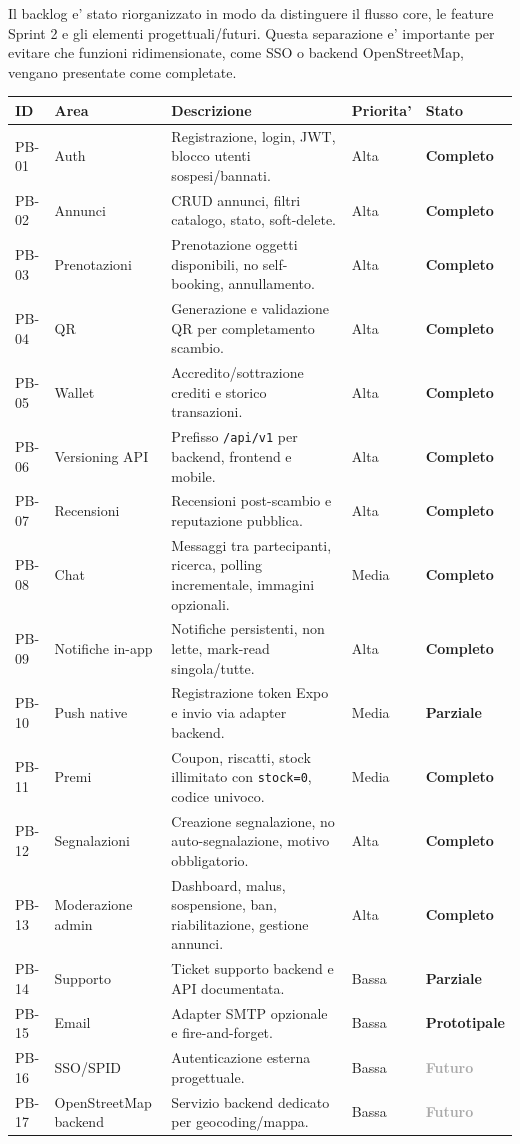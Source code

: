 \documentclass[11pt,a4paper]{article}
\newcommand{\ok}{\textcolor{revalueGreen}{\textbf{Completo}}}
\newcommand{\partiale}{\textcolor{revalueOrange}{\textbf{Parziale}}}
\newcommand{\proto}{\textcolor{revalueOrange}{\textbf{Prototipale}}}
\newcommand{\future}{\textcolor{darkGray}{\textbf{Futuro}}}
\newcommand{\code}[1]{\texttt{#1}}
\begin{document}
Il backlog e' stato riorganizzato in modo da distinguere il flusso core, le feature
Sprint 2 e gli elementi progettuali/futuri. Questa separazione e' importante per
evitare che funzioni ridimensionate, come SSO o backend OpenStreetMap, vengano
presentate come completate.

\begin{longtable}{L{1.2cm} L{3.2cm} L{5.6cm} L{2.1cm} L{2.4cm}}
\toprule
\textbf{ID} & \textbf{Area} & \textbf{Descrizione} & \textbf{Priorita'} & \textbf{Stato} \\
\midrule
PB-01 & Auth & Registrazione, login, JWT, blocco utenti sospesi/bannati. & Alta & \ok \\
PB-02 & Annunci & CRUD annunci, filtri catalogo, stato, soft-delete. & Alta & \ok \\
PB-03 & Prenotazioni & Prenotazione oggetti disponibili, no self-booking, annullamento. & Alta & \ok \\
PB-04 & QR & Generazione e validazione QR per completamento scambio. & Alta & \ok \\
PB-05 & Wallet & Accredito/sottrazione crediti e storico transazioni. & Alta & \ok \\
PB-06 & Versioning API & Prefisso \code{/api/v1} per backend, frontend e mobile. & Alta & \ok \\
PB-07 & Recensioni & Recensioni post-scambio e reputazione pubblica. & Alta & \ok \\
PB-08 & Chat & Messaggi tra partecipanti, ricerca, polling incrementale, immagini opzionali. & Media & \ok \\
PB-09 & Notifiche in-app & Notifiche persistenti, non lette, mark-read singola/tutte. & Alta & \ok \\
PB-10 & Push native & Registrazione token Expo e invio via adapter backend. & Media & \partiale \\
PB-11 & Premi & Coupon, riscatti, stock illimitato con \code{stock=0}, codice univoco. & Media & \ok \\
PB-12 & Segnalazioni & Creazione segnalazione, no auto-segnalazione, motivo obbligatorio. & Alta & \ok \\
PB-13 & Moderazione admin & Dashboard, malus, sospensione, ban, riabilitazione, gestione annunci. & Alta & \ok \\
PB-14 & Supporto & Ticket supporto backend e API documentata. & Bassa & \partiale \\
PB-15 & Email & Adapter SMTP opzionale e fire-and-forget. & Bassa & \proto \\
PB-16 & SSO/SPID & Autenticazione esterna progettuale. & Bassa & \future \\
PB-17 & OpenStreetMap backend & Servizio backend dedicato per geocoding/mappa. & Bassa & \future \\
\bottomrule
\end{longtable}
\end{document}
